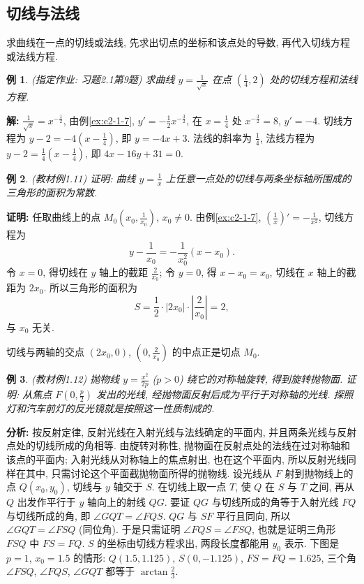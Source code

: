 \documentclass[UTF8,openany]{ctexbook}
\theoremstyle{chinesetextbook}
\newtheorem{example}{例}[section]
\newenvironment{cnproof}{\par\indent\textbf{证明:} \ignorespaces}{\par}
\newenvironment{cnsolution}{\par\indent\textbf{解:} \ignorespaces}{\par}
\begin{document}
\subsection{切线与法线}
求曲线在一点的切线或法线, 先求出切点的坐标和该点处的导数, 再代入切线方程或法线方程.
\begin{example}\label{ex:c2-h1-9}
\textnormal{(指定作业: 习题2.1第9题)} 求曲线 $\displaystyle y=\frac1{\sqrt x}$ 在点 $\displaystyle\left(\frac14,2\right)$ 处的切线方程和法线方程.
\end{example}
\begin{cnsolution}
$\displaystyle\frac1{\sqrt x}=x^{-\frac12}$, 由例\ref{ex:c2-1-7}, $\displaystyle y'=-\frac12x^{-\frac32}$, 在 $\displaystyle x=\frac14$ 处 $x^{-\frac32}=8$, $y'=-4$. 切线方程为 $\displaystyle y-2=-4\left(x-\frac14\right)$, 即 $y=-4x+3$. 法线的斜率为 $\displaystyle\frac14$, 法线方程为 $\displaystyle y-2=\frac14\left(x-\frac14\right)$, 即 $4x-16y+31=0$.
\end{cnsolution}
\begin{example}\label{ex:c2-1-11}
\textnormal{(教材例1.11)} 证明: 曲线 $\displaystyle y=\frac1x$ 上任意一点处的切线与两条坐标轴所围成的三角形的面积为常数.
\end{example}
\begin{cnproof}
任取曲线上的点 $\displaystyle M_0\left(x_0,\frac1{x_0}\right)$, $x_0\ne0$. 由例\ref{ex:c2-1-7}, $\displaystyle\left(\frac1x\right)'=-\frac1{x^2}$, 切线方程为
\[
y-\frac1{x_0}=-\frac1{x_0^2}(x-x_0).
\]
令 $x=0$, 得切线在 $y$ 轴上的截距 $\displaystyle\frac2{x_0}$; 令 $y=0$, 得 $x-x_0=x_0$, 切线在 $x$ 轴上的截距为 $2x_0$. 所以三角形的面积为
\[
S=\frac12\cdot|2x_0|\cdot\left|\frac2{x_0}\right|=2,
\]
与 $x_0$ 无关.
\end{cnproof}
切线与两轴的交点 $(2x_0,0)$, $\displaystyle\left(0,\frac2{x_0}\right)$ 的中点正是切点 $M_0$.
\begin{example}\label{ex:c2-1-12}
\textnormal{(教材例1.12)} 抛物线 $\displaystyle y=\frac{x^2}{2p}$ ($p>0$) 绕它的对称轴旋转, 得到旋转抛物面. 证明: 从焦点 $\displaystyle F\left(0,\frac p2\right)$ 发出的光线, 经抛物面反射后成为平行于对称轴的光线. 探照灯和汽车前灯的反光镜就是按照这一性质制成的.
\end{example}
\par\indent\textbf{分析:} 按反射定律, 反射光线在入射光线与法线确定的平面内, 并且两条光线与反射点处的切线所成的角相等. 由旋转对称性, 抛物面在反射点处的法线在过对称轴和该点的平面内; 入射光线从对称轴上的焦点射出, 也在这个平面内, 所以反射光线同样在其中, 只需讨论这个平面截抛物面所得的抛物线. 设光线从 $F$ 射到抛物线上的点 $Q(x_0,y_0)$, 切线与 $y$ 轴交于 $S$. 在切线上取一点 $T$, 使 $Q$ 在 $S$ 与 $T$ 之间, 再从 $Q$ 出发作平行于 $y$ 轴向上的射线 $QG$. 要证 $QG$ 与切线所成的角等于入射光线 $FQ$ 与切线所成的角, 即 $\angle GQT=\angle FQS$. $QG$ 与 $SF$ 平行且同向, 所以 $\angle GQT=\angle FSQ$ (同位角). 于是只需证明 $\angle FQS=\angle FSQ$, 也就是证明三角形 $FSQ$ 中 $FS=FQ$. $S$ 的坐标由切线方程求出, 两段长度都能用 $y_0$ 表示. 下图是 $p=1$, $x_0=1.5$ 的情形: $Q(1.5,1.125)$, $S(0,-1.125)$, $FS=FQ=1.625$, 三个角 $\angle FSQ$, $\angle FQS$, $\angle GQT$ 都等于 $\displaystyle\arctan\frac23$.
\end{document}
